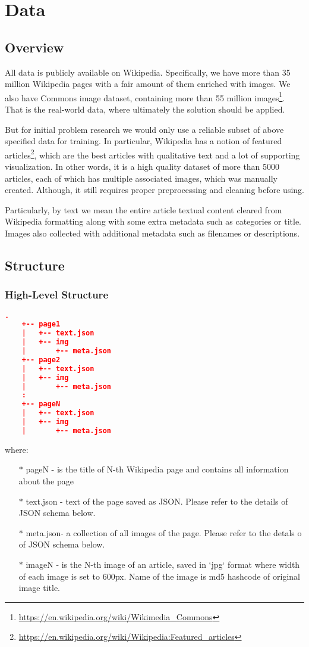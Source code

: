 \chapter{Data}
\section{Overview}
All data is publicly available on Wikipedia. Specifically, we have more than 35 million Wikipedia pages with a fair amount of them enriched with images. We also have Commons image dataset\cite{ref_wiki_commons}, containing more than 55 million images\footnote{\url{https://en.wikipedia.org/wiki/Wikimedia_Commons}}. That is the real-world data, where ultimately the solution should be applied.

But for initial problem research we would only use a reliable subset of above specified data for training. In particular, Wikipedia has a notion of featured articles\footnote{\url{https://en.wikipedia.org/wiki/Wikipedia:Featured_articles}}, which are the best articles with qualitative text and a lot of supporting visualization. In other words, it is a high quality dataset of more than 5000 articles, each of which has multiple associated images, which was manually created. Although, it still requires proper preprocessing and cleaning before using.

Particularly, by text we mean the entire article textual content cleared from Wikipedia formatting along with some extra metadata such as categories or title. Images also collected with additional metadata such as filenames or descriptions.

\section{Structure}
\subsection{High-Level Structure}
\begin{lstlisting}[language=json,firstnumber=1]
    .
    +-- page1  
    |   +-- text.json  
    |   +-- img  
    |       +-- meta.json
    +-- page2  
    |   +-- text.json  
    |   +-- img  
    |       +-- meta.json
    :  
    +-- pageN  
    |   +-- text.json  
    |   +-- img  
    |       +-- meta.json
\end{lstlisting}

where:
\begin{itemize}
    \item[$\ast$] pageN - is the title of N-th Wikipedia page and contains all information about the page
    \item[$\ast$] text.json - text of the page saved as JSON. Please refer to the details of JSON schema below.
    \item[$\ast$] meta.json- a collection of all images of the page. Please refer to the detals o of JSON schema below.
    \item[$\ast$] imageN - is the N-th image of an article, saved in `jpg` format where width of each image is set to 600px. Name of the image is md5 hashcode of original image title. 
\end{itemize}

